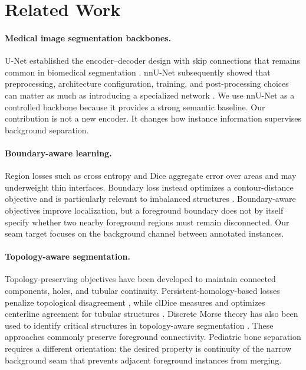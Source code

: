 \section{Related Work}

\paragraph{Medical image segmentation backbones.}
U-Net established the encoder--decoder design with skip connections that remains common in biomedical segmentation \citep{ronneberger2015unet}. nnU-Net subsequently showed that preprocessing, architecture configuration, training, and post-processing choices can matter as much as introducing a specialized network \citep{isensee2021nnunet}. We use nnU-Net as a controlled backbone because it provides a strong semantic baseline. Our contribution is not a new encoder. It changes how instance information supervises background separation.

\paragraph{Boundary-aware learning.}
Region losses such as cross entropy and Dice aggregate error over areas and may underweight thin interfaces. Boundary loss instead optimizes a contour-distance objective and is particularly relevant to imbalanced structures \citep{kervadec2019boundary}. Boundary-aware objectives improve localization, but a foreground boundary does not by itself specify whether two nearby foreground regions must remain disconnected. Our seam target focuses on the background channel between annotated instances.

\paragraph{Topology-aware segmentation.}
Topology-preserving objectives have been developed to maintain connected components, holes, and tubular continuity. Persistent-homology-based losses penalize topological disagreement \citep{hu2019topology}, while clDice measures and optimizes centerline agreement for tubular structures \citep{shit2021cldice}. Discrete Morse theory has also been used to identify critical structures in topology-aware segmentation \citep{hu2021morse}. These approaches commonly preserve foreground connectivity. Pediatric bone separation requires a different orientation: the desired property is continuity of the narrow background seam that prevents adjacent foreground instances from merging.

